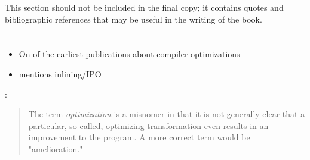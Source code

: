 
This section should not be included in the final copy;
it contains quotes and bibliographic references that may be useful in the writing of the book.

\vspace{1em}

\section{}

\begin{itemize}
    \item On of the earliest publications about compiler optimizations
    \item mentions inlining/IPO
\end{itemize}
\cite{allen_catalogue_1971}:
\begin{quotation}
    The term \textit{optimization} is a misnomer in that it is not generally clear that a particular, so called, optimizing transformation even results in an improvement to the program. A more correct term would be "amelioration."
\end{quotation}

